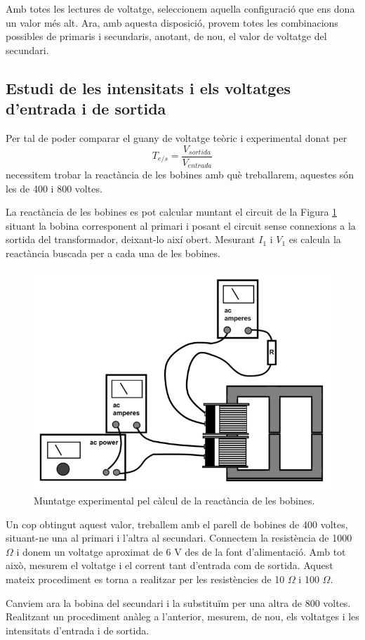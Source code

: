 \documentclass[a4paper,10.5pt]{report}
\begin{document}
Amb totes les lectures de voltatge, seleccionem aquella configuració que ens dona un valor més alt. Ara, amb aquesta disposició, provem totes les combinacions possibles de primaris i secundaris, anotant, de nou, el valor de voltatge del secundari.

\subsection{Estudi de les intensitats i els voltatges d'entrada i de sortida}
Per tal de poder comparar el guany de voltatge teòric i experimental donat per
\begin{equation}
	T_{e/s}=\frac{V_{sortida}}{V_{entrada}}
	\label{eq4:25}
\end{equation}
necessitem trobar la reactància de les bobines amb què treballarem, aquestes són les de 400 i 800 voltes.

La reactància de les bobines es pot calcular muntant el circuit de la Figura \ref{fig4:4} situant la bobina corresponent al primari i posant el circuit sense connexions a la sortida del transformador, deixant-lo així obert. Mesurant $I_1$ i $V_1$ es calcula la reactància buscada per a cada una de les bobines.

\begin{figure}[h]
	\centering
	\includegraphics[width=0.4\linewidth]{screenshot010}
	\caption{Muntatge experimental pel càlcul de la reactància de les bobines.}
	\label{fig4:4}
\end{figure}

Un cop obtingut aquest valor, treballem amb el parell de bobines de 400 voltes, situant-ne una al primari i l'altra al secundari. Connectem la resistència de 1000 $\Omega$ i donem un voltatge aproximat de 6 V des de la font d'alimentació. Amb tot això, mesurem el voltatge i el corrent tant d'entrada com de sortida. Aquest mateix procediment es torna a realitzar per les resistències de 10 $\Omega$ i 100 $\Omega$.

Canviem ara la bobina del secundari i la substituïm per una altra de 800 voltes. Realitzant un procediment anàleg a l'anterior, mesurem, de nou, els voltatges i les intensitats d'entrada i de sortida.
\end{document}
